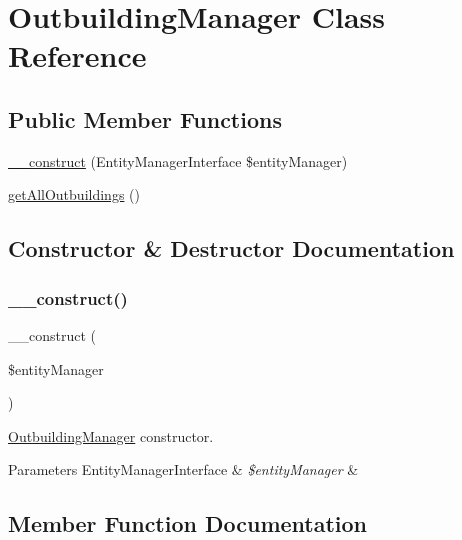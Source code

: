 \hypertarget{class_app_1_1_b_l_1_1_outbuilding_manager}{}\section{Outbuilding\+Manager Class Reference}
\label{class_app_1_1_b_l_1_1_outbuilding_manager}
\subsection*{Public Member Functions}
\begin{DoxyCompactItemize}
\item 
\mbox{\hyperlink{class_app_1_1_b_l_1_1_outbuilding_manager_abb5fb9a65dd8a81e7482dddbf71c5177}{\+\_\+\+\_\+construct}} (Entity\+Manager\+Interface \$entity\+Manager)
\item 
\mbox{\hyperlink{class_app_1_1_b_l_1_1_outbuilding_manager_a013df80c782d8935129b2f23843ca721}{get\+All\+Outbuildings}} ()
\end{DoxyCompactItemize}


\subsection{Constructor \& Destructor Documentation}
\mbox{\label{class_app_1_1_b_l_1_1_outbuilding_manager_abb5fb9a65dd8a81e7482dddbf71c5177}} 
\subsubsection{\texorpdfstring{\_\_construct()}{\_\_construct()}}
{\footnotesize\ttfamily \+\_\+\+\_\+construct (\begin{DoxyParamCaption}\item[{Entity\+Manager\+Interface}]{\$entity\+Manager }\end{DoxyParamCaption})}

\mbox{\hyperlink{class_app_1_1_b_l_1_1_outbuilding_manager}{Outbuilding\+Manager}} constructor. 
\begin{DoxyParams}[1]{Parameters}
Entity\+Manager\+Interface & {\em \$entity\+Manager} & \\
\hline
\end{DoxyParams}


\subsection{Member Function Documentation}
\mbox{\label{class_app_1_1_b_l_1_1_outbuilding_manager_a013df80c782d8935129b2f23843ca721}} 
